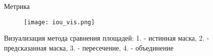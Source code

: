 
\begin{frame}{Метрика}
\begin{figure}
\centering
\texttt{[image: iou\_vis.png]}
\end{figure}
    Визуализация метода сравнения площадей:
    1. - истинная маска, 2. - предсказанная маска, 3. - пересечение, 4. - объединение

\end{frame}